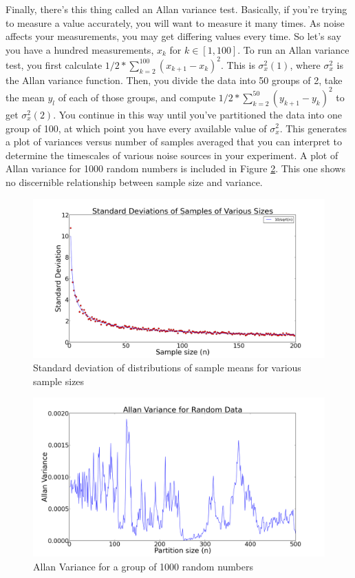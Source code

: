 \documentclass[11pt]{article}
\begin{document}
Finally, there's this thing called an Allan variance test. Basically, if you're trying to measure a value accurately, you will want to measure it many
times. As noise affects your measurements, you may get differing values every time. So let's say you have a hundred measurements,
$x_k$ for $k \in [1, 100]$. To run an Allan variance test, you first calculate $1/2*\sum_{k=2}^{100}(x_{k+1}-x_k)^2$. This is $\sigma_x^2(1)$,
where $\sigma_x^2$ is the Allan variance function. Then, you divide the data into 50 groups of 2, take the mean $y_l$ of each of
those groups, and compute $1/2 * \sum_{k=2}^{50}(y_{k+1}-y_k)^2$ to get $\sigma_x^2(2)$. You continue in this way until you've 
partitioned the data into one group of 100, at which point you have every available value of $\sigma_x^2$. This generates
a plot of variances versus number of samples averaged that you can interpret to determine the timescales of various noise
sources in your experiment. A plot of Allan variance for 1000 random numbers is included in Figure \ref{allan}. This one shows
no discernible relationship between sample size and variance. 

\begin{figure}
\includegraphics[scale=0.4]{stdev}
\caption{Standard deviation of distributions of sample means for various sample sizes \label{stdev}}
\end{figure}

\begin{figure}
\includegraphics[scale=0.4]{allan}
\caption{Allan Variance for a group of 1000 random numbers \label{allan}}
\end{figure}
\end{document}
